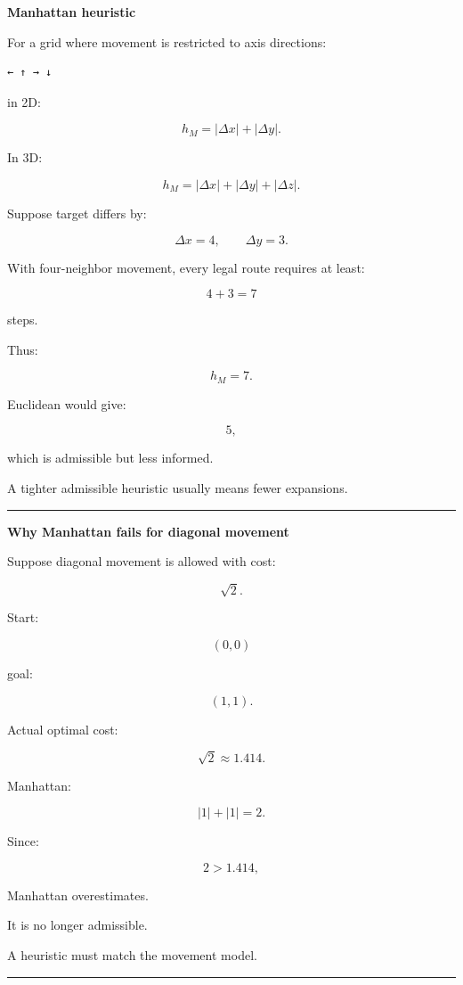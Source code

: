 \textbf{Manhattan heuristic}

For a grid where movement is restricted to axis directions:

\begin{verbatim}
← ↑ → ↓
\end{verbatim}

in 2D:

\[
\boxed{
h_M=
|\Delta x|+|\Delta y|.
}
\]

In 3D:

\[
h_M=
|\Delta x|+
|\Delta y|+
|\Delta z|.
\]

Suppose target differs by:

\[
\Delta x=4,
\qquad
\Delta y=3.
\]

With four-neighbor movement, every legal route requires at least:

\[
4+3=7
\]

steps.

Thus:

\[
h_M=7.
\]

Euclidean would give:

\[
5,
\]

which is admissible but less informed.

A tighter admissible heuristic usually means fewer expansions.

\begin{center}\rule{0.5\linewidth}{0.5pt}\end{center}

\textbf{Why Manhattan fails for diagonal movement}

Suppose diagonal movement is allowed with cost:

\[
\sqrt2.
\]

Start:

\[
(0,0)
\]

goal:

\[
(1,1).
\]

Actual optimal cost:

\[
\sqrt2\approx1.414.
\]

Manhattan:

\[
|1|+|1|=2.
\]

Since:

\[
2>1.414,
\]

Manhattan overestimates.

It is no longer admissible.

A heuristic must match the movement model.

\begin{center}\rule{0.5\linewidth}{0.5pt}\end{center}

